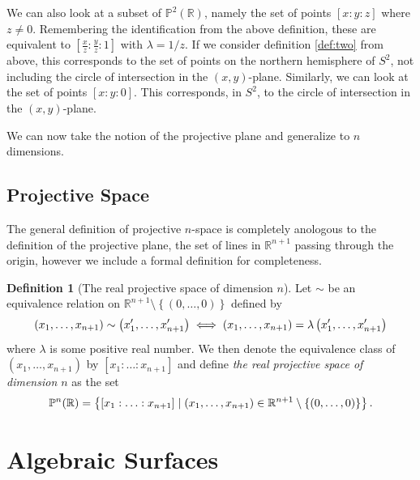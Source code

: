 \documentclass{article}
\theoremstyle{definition}
\newtheorem{defn}{Definition}
\theoremstyle{plain}
\newcommand{\proj}{\ensuremath{\mathbb{P}}} %
\newcommand{\R}{\ensuremath{\mathbb{R}}}    %
\newcommand{\projp}[3]{\ensuremath{[ #1 : #2 : #3 ]}}
\begin{document}
We can also look at a subset of $\proj^2(\R)$, namely the set of points
$\projp{x}{y}{z}$ where $z \neq 0$. Remembering the identification from the
above definition, these are equivalent to $\projp{\frac{x}{z}}{\frac{y}{z}}{1}$
with $\lambda = 1 / z$. If we consider definition \ref{def:two} from above,
this corresponds to the set of points on the northern hemisphere of $S^2$, not
including the circle of intersection in the $(x,y)$-plane. Similarly, we can
look at the set of points $\projp{x}{y}{0}$. This corresponds, in $S^2$, to the
circle of intersection in the $(x, y)$-plane. 

We can now take the notion of the projective plane and generalize to $n$
dimensions.
\subsection{Projective Space}
\label{sub:projective_space}

The general definition of projective $n$-space is completely anologous to the
definition of the projective plane, the set of lines in $\R^{n+1}$ passing
through the origin, however we include a formal definition for completeness.

\begin{defn}[The real projective space of dimension $n$]
    Let $\sim$ be an equivalence relation on $\R^{n+1}\setminus \left\{ \left(
    0, \ldots, 0 \right) \right\}$ defined by
    \begin{equation}
        \notag
        \left( x_1, \ldots, x_{n+1} \right) \sim \left( x_1', \ldots, x_{n+1}' \right) 
        \iff \left( x_1, \ldots, x_{n+1} \right) = \lambda \left( x_1', \ldots, x_{n+1}' \right)
    \end{equation} 
    where $\lambda$ is some positive real number. We then denote the
    equivalence class of $\left( x_1, \ldots, x_{n+1} \right)$ by
    $\projp{x_1}{\ldots}{x_{n+1}}$ and define \emph{the real projective space
    of dimension $n$} as the set
    \begin{equation}
        \notag
        \proj^n(\R) = \left\{ \projp{x_1}{\ldots}{x_{n+1}} \mid \left( x_1, \ldots, x_{n+1} \right) \in \R^{n+1} \setminus \left\{ \left( 0, \ldots, 0 \right) \right\} \right\}.
    \end{equation}

\end{defn}

\section{Algebraic Surfaces}
\label{sec:algebraic_surfaces}

\printindex
\printbibliography
\end{document}
